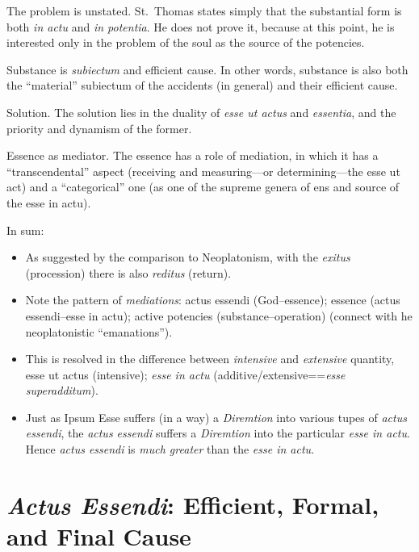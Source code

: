 \begin{DONE}
The problem is unstated.
St.~Thomas states simply that the substantial form is both \emph{in actu} and \emph{in potentia}. He does not prove it, because at this point, he is interested only in the problem of the soul as the source of the potencies.

Substance is \emph{subiectum} and efficient cause.
In other words, substance is also both the “material” subiectum of the accidents (in general) and their efficient cause.

Solution. The solution lies in the duality of \emph{esse ut actus} and \emph{essentia}, and the priority and dynamism of the former.

Essence as mediator.
The essence has a role of mediation, in which it has a “transcendental” aspect (receiving and measuring—or determining—the esse ut act) and a “categorical” one (as one of the supreme genera of ens and source of the esse in actu).


\end{DONE}

\begin{DONE}

In sum:

\begin{itemize}

  \item As suggested by the comparison to Neoplatonism, with the \emph{exitus} (procession) there is also \emph{reditus} (return).

  \item Note the pattern of \emph{mediations}: actus essendi (God--essence); essence (actus essendi--esse in actu); active potencies (substance--operation) (connect with he neoplatonistic ``emanations'').

  \item This is resolved in the difference between \emph{intensive} and \emph{extensive} quantity, esse ut actus (intensive); \emph{esse in actu} (additive/extensive==\emph{esse superadditum}).

  \item Just as Ipsum Esse suffers (in a way) a \emph{Diremtion} into various tupes of \emph{actus essendi}, the \emph{actus essendi} suffers a \emph{Diremtion} into the particular \emph{esse in actu}. Hence \emph{actus essendi} is \emph{much greater} than the \emph{esse in actu}.

\end{itemize}
\end{DONE}


\section{\emph{Actus Essendi}: Efficient, Formal, and Final Cause}

